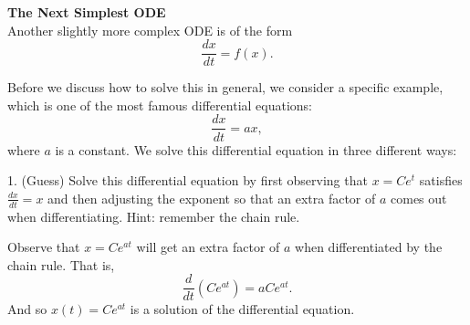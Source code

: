 \documentclass[twoside,openright,titlepage,a4paper]{book}
\begin{document}
\begin{sloppypar}
\textbf{The Next Simplest ODE}\\

Another slightly more complex ODE is of the form \[ \frac{dx}{dt} = f(x). \]

Before we discuss how to solve this in general, we consider a specific example, which is one of the most famous differential equations: \[ \frac{dx}{dt} = ax, \] where $a$ is a constant. We solve this differential equation in three different ways:

1. (Guess) Solve this differential equation by first observing that $x = Ce^t$ satisfies $\frac{dx}{dt} = x$ and then adjusting the exponent so that an extra factor of $a$ comes out when differentiating. Hint: remember the chain rule.
\begin{examplebox}
Observe that $x = Ce^{at}$ will get an extra factor of $a$ when differentiated by the chain rule. That is, \[ \frac{d}{dt} \left(Ce^{at}\right) = a Ce^{at}. \] And so $x(t) = Ce^{at}$ is a solution of the differential equation.	
\end{examplebox}


\end{sloppypar}
\end{document}
